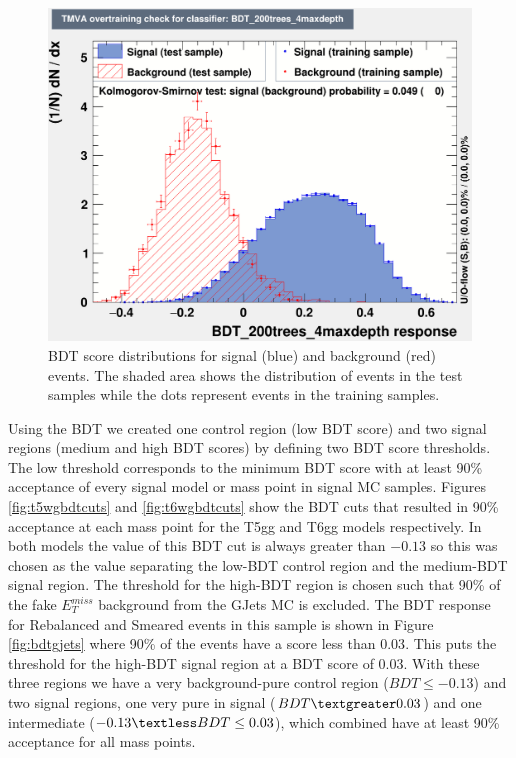 \begin{figure}[h]
	\centering
	\includegraphics[width=1.0\linewidth]{Figures/BDT_response}
	\caption[BDT training and testing results]{BDT score distributions for signal (blue) and background (red) events.  The shaded area shows the distribution of events in the test samples while the dots represent events in the training samples.}
	\label{fig:bdtresponse}
\end{figure}

Using the BDT we created one control region (low BDT score) and two signal regions (medium and high BDT scores) by defining two BDT score thresholds.  The low threshold corresponds to the minimum BDT score with at least 90\% acceptance of every signal model or mass point in signal MC samples.  Figures \ref{fig:t5wgbdtcuts} and \ref{fig:t6wgbdtcuts} show the BDT cuts that resulted in 90\% acceptance at each mass point for the T5gg and T6gg models respectively.  In both models the value of this BDT cut is always greater than $-0.13$ so this was chosen as the value separating the low-BDT control region and the medium-BDT signal region.  The threshold for the high-BDT region is chosen such that 90\% of the fake $E^{miss}_T$ background from the GJets MC is excluded.  The BDT response for Rebalanced and Smeared events in this sample is shown in Figure \ref{fig:bdtgjets} where 90\% of the events have a score less than $0.03$.  This puts the threshold for the high-BDT signal region at a BDT score of $0.03$.  With these three regions we have a very background-pure control region ($BDT \leq -0.13$) and two signal regions, one very pure in signal ($BDT\textgreater 0.03$) and one intermediate ($-0.13 \textless BDT \leq 0.03$), which combined have at least 90\% acceptance for all mass points.

